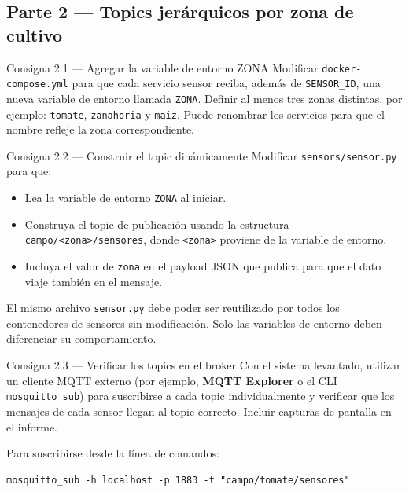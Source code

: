 \documentclass[12pt,a4paper]{article}
\begin{document}
\subsection{Parte 2 — Topics jerárquicos por zona de cultivo}

\begin{consigna}{Consigna 2.1 — Agregar la variable de entorno ZONA}
Modificar \texttt{docker-compose.yml} para que cada servicio sensor reciba,
además de \texttt{SENSOR\_ID}, una nueva variable de entorno llamada
\texttt{ZONA}. Definir al menos tres zonas distintas, por ejemplo:
\texttt{tomate}, \texttt{zanahoria} y \texttt{maiz}. Puede renombrar
los servicios para que el nombre refleje la zona correspondiente.
\end{consigna}

\begin{consigna}{Consigna 2.2 — Construir el topic dinámicamente}
Modificar \texttt{sensors/sensor.py} para que:
\begin{itemize}
  \item Lea la variable de entorno \texttt{ZONA} al iniciar.
  \item Construya el topic de publicación usando la estructura
        \texttt{campo/<zona>/sensores}, donde \texttt{<zona>} proviene
        de la variable de entorno.
  \item Incluya el valor de \texttt{zona} en el payload JSON que publica
        para que el dato viaje también en el mensaje.
\end{itemize}
El mismo archivo \texttt{sensor.py} debe poder ser reutilizado por todos
los contenedores de sensores sin modificación. Solo las variables de entorno
deben diferenciar su comportamiento.
\end{consigna}

\begin{consigna}{Consigna 2.3 — Verificar los topics en el broker}
Con el sistema levantado, utilizar un cliente MQTT externo (por ejemplo,
\textbf{MQTT Explorer} o el CLI \texttt{mosquitto\_sub}) para suscribirse
a cada topic individualmente y verificar que los mensajes de cada sensor
llegan al topic correcto. Incluir capturas de pantalla en el informe.

Para suscribirse desde la línea de comandos:
\begin{lstlisting}[style=texto]
mosquitto_sub -h localhost -p 1883 -t "campo/tomate/sensores"
\end{lstlisting}
\end{consigna}
\end{document}
